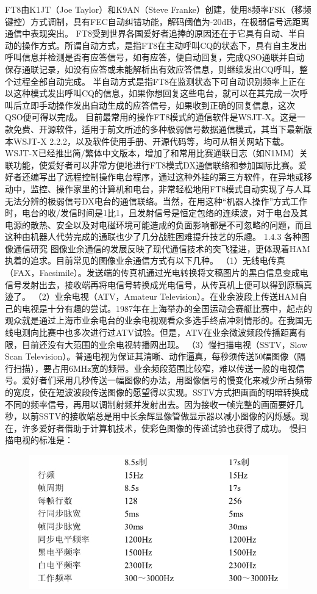 \documentclass[12pt,UTF8]{ctexbook}
\begin{document}
FT8由K1JT（Joe Taylor）和K9AN（Steve Franke）创建，使用8频率FSK（移频键控）方式调制，具有FEC自动纠错功能，解码阈值为-20dB，在极弱信号远距离通信中表现突出。
FT8受到世界各国爱好者追捧的原因还在于它具有自动、半自动的操作方式。所谓自动方式，是指FT8在主动呼叫CQ的状态下，具有自主发出呼叫信息并检测是否有应答信号，如有应答，便自动回复，完成QSO通联并自动保存通联记录，如没有应答或未能解析出有效应答信息，则继续发出CQ呼叫，整个过程全部自动完成。
半自动方式是指FT8在监测状态下可自动识别频率上正在以这种模式发出呼叫CQ的信息，如果你想回复这些电台，就可以在其完成一次呼叫后立即手动操作发出自动生成的应答信号，如果收到正确的回复信息，这次QSO便可得以完成。
目前最常用的操作FT8模式的通信软件是WSJT-X。这是一款免费、开源软件，适用于前文所述的多种极弱信号数据通信模式，其当下最新版本WSJT-X 2.2.2，以及软件使用手册、开源代码等，均可从相关网站下载。
WSJT-X已经推出简/繁体中文版本，增加了和常用比赛通联日志（如N1MM）关联功能，使爱好者可以非常方便地进行FT8模式DX通信联络和参加国际比赛。爱好者还编写出了远程控制操作电台程序，通过这种外挂的第三方软件，在异地或移动中，监控、操作家里的计算机和电台，非常轻松地用FT8模式自动实现了与人耳无法分辨的极弱信号DX电台的通信联络。当然，在用这种“机器人操作”方式工作时，电台的收/发信时间是1比1，且发射信号是恒定包络的连续波，对于电台及其电源的散热、安全以及对电磁环境可能造成的负面影响都是不可忽略的问题，而且这种由机器人代劳完成的通联也少了几分战胜困难提升技艺的乐趣。
1.4.3 各种图像通信研究
图像业余通信的发展反映了现代通信技术的突飞猛进，更体现着HAM执着的追求。目前常见的图像业余通信方式有以下几种。
（1）无线电传真（FAX，Facsimile）。发送端的传真机通过光电转换将文稿图片的黑白信息变成电信号发射出去，接收端再将电信号转换成光电信号，从传真机上便可以得到原稿真迹了。
（2）业余电视（ATV，Amateur Television）。在业余波段上传送HAM自己的电视是十分有趣的尝试。1987年在上海举办的全国运动会赛艇比赛中，起点的观众就是通过上海市业余电台的业余电视观看众多选手终点冲刺情形的。在我国无线电测向比赛中也多次进行过ATV试验。但是，ATV在业余微波频段传播距离有限，目前还没有大范围的业余电视转播网出现。
（3）慢扫描电视（SSTV，Slow Scan Television）。普通电视为保证其清晰、动作逼真，每秒须传送50幅图像（隔行扫描），要占用6MHz宽的频带。业余频段范围比较窄，难以传送一般的电视信号。爱好者们采用几秒传送一幅图像的办法，用图像信号的慢变化来减少所占频带的宽度，使在短波波段传送图像的愿望得以实现。SSTV方式把画面的明暗转换成不同的频率信号，再用以调制射频并发射出去。因为接收一帧完整的画面要好几秒，以前SSTV的接收端总是用中长余辉显像管做显示器以减小图像的闪烁感。现在，许多爱好者借助于计算机技术，使彩色图像的传递试验也获得了成功。
慢扫描电视的标准是：

\begin{figure}[htbp]
	\centering
	\includegraphics[width=0.7\linewidth]{86}
	\caption{}
	\label{fig:1}
\end{figure}
\end{document}
